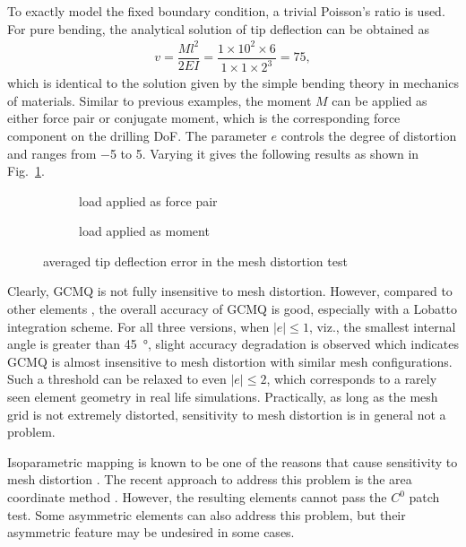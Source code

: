 \documentclass[3p,sort&compress,review,11pt]{elsarticle}
\newcommand*{\figref}[1]{Fig.~\ref{#1}}
\begin{document}
To exactly model the fixed boundary condition, a trivial Poisson's ratio is used. For pure bending, the analytical solution of tip deflection \citep{Timoshenko1970} can be obtained as
\begin{gather}
v=\dfrac{Ml^2}{2EI}=\dfrac{1\times10^2\times6}{1\times1\times2^3}=75,
\end{gather}
which is identical to the solution given by the simple bending theory in mechanics of materials. Similar to previous examples, the moment $M$ can be applied as either force pair or conjugate moment, which is the corresponding force component on the drilling DoF. The parameter $e$ controls the degree of distortion and ranges from \num{-5} to \num{5}. Varying it gives the following results as shown in \figref{fig:distortion_result}.
\begin{figure}[htb]
\centering\scriptsize
\begin{subfigure}[b]{.49\textwidth}\centering

\caption{load applied as force pair}
\end{subfigure}\quad
\begin{subfigure}[b]{.49\textwidth}\centering

\caption{load applied as moment}
\end{subfigure}
\caption{averaged tip deflection error in the mesh distortion test}\label{fig:distortion_result}
\end{figure}
Clearly, GCMQ is not fully insensitive to mesh distortion. However, compared to other elements \citep[cf.][]{Cen2015}, the overall accuracy of GCMQ is good, especially with a Lobatto integration scheme. For all three versions, when $\left\lvert{}e\right\rvert\leqslant1$, viz., the smallest internal angle is greater than \SI{45}{\degree}, slight accuracy degradation is observed which indicates GCMQ is almost insensitive to mesh distortion with similar mesh configurations. Such a threshold can be relaxed to even $\left\lvert{}e\right\rvert\leqslant2$, which corresponds to a rarely seen element geometry in real life simulations. Practically, as long as the mesh grid is not extremely distorted, sensitivity to mesh distortion is in general not a problem.

Isoparametric mapping is known to be one of the reasons that cause sensitivity to mesh distortion \citep{Lee1993}. The recent approach to address this problem is the area coordinate method \citep{Long2010}. However, the resulting elements cannot pass the $C^0$ patch test. Some asymmetric elements \cite[e.g.,][]{Cen2015} can also address this problem, but their asymmetric feature may be undesired in some cases.
\end{document}
